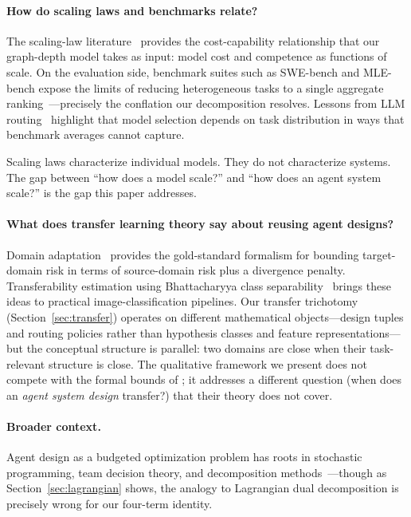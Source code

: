 \documentclass[twoside,11pt]{article}
\begin{document}
\paragraph{How do scaling laws and benchmarks relate?}
The scaling-law literature~\citep{kaplan2020scaling,hoffmann2022chinchilla} provides the cost-capability relationship that our graph-depth model takes as input: model cost and competence as functions of scale.
On the evaluation side, benchmark suites such as SWE-bench and MLE-bench expose the limits of reducing heterogeneous tasks to a single aggregate ranking~\citep{jimenez2024swebench,chan2024mlebench}---precisely the conflation our decomposition resolves.
Lessons from LLM routing~\citep{chen2025optimizing} highlight that model selection depends on task distribution in ways that benchmark averages cannot capture.

Scaling laws characterize individual models.
They do not characterize systems.
The gap between ``how does a model scale?'' and ``how does an agent system scale?'' is the gap this paper addresses.

\paragraph{What does transfer learning theory say about reusing agent designs?}
Domain adaptation~\citep{bendavid2010theory} provides the gold-standard formalism for bounding target-domain risk in terms of source-domain risk plus a divergence penalty.
Transferability estimation using Bhattacharyya class separability~\citep{pandy2022transferability} brings these ideas to practical image-classification pipelines.
Our transfer trichotomy (Section~\ref{sec:transfer}) operates on different mathematical objects---design tuples and routing policies rather than hypothesis classes and feature representations---but the conceptual structure is parallel: two domains are close when their task-relevant structure is close.
The qualitative framework we present does not compete with the formal bounds of \citet{bendavid2010theory}; it addresses a different question (when does an \emph{agent system design} transfer?) that their theory does not cover.

\paragraph{Broader context.}
Agent design as a budgeted optimization problem has roots in stochastic programming, team decision theory, and decomposition methods~\citep{fisher2004lagrangian}---though as Section~\ref{sec:lagrangian} shows, the analogy to Lagrangian dual decomposition is precisely wrong for our four-term identity.
\end{document}
